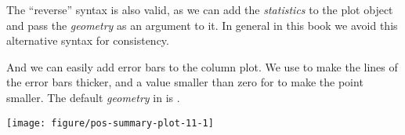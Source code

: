 \documentclass[krantz2]{krantz}\usepackage{knitr}%
\begin{document}
\begin{knitrout}\footnotesize
{}\color{fgcolor}\begin{kframe}
\begin{alltt}
  \hlopt{+}
  \hlstd{(} \hlstd{=} \hlstd{,}  
\end{alltt}
\end{kframe}
\end{knitrout}

The ``reverse'' syntax is also valid, as we can add the \emph{statistics} to the plot object and pass the \emph{geometry} as an argument to it. In general in this book we avoid this alternative syntax for consistency.

\begin{knitrout}\footnotesize
{}\color{fgcolor}\begin{kframe}
\begin{alltt}
  \hlopt{+}
  \hlstd{(} \hlstd{=} \hlstd{,}  
\end{alltt}
\end{kframe}
\end{knitrout}

And we can easily add error bars to the column plot. We use  to make the lines of the error bars thicker, and a value smaller than zero for  to make the point smaller. The default \emph{geometry} in  is .

\begin{knitrout}\footnotesize
{}\color{fgcolor}\begin{kframe}
\begin{alltt}
  \hlopt{+}
  \hlstd{(} \hlstd{=} \hlstd{,}   \hlopt{+}
  \hlstd{(} \hlstd{=} \hlstd{,}  \hlstd{=} \hlstd{,}
                \hlstd{=} \hlstd{,}  \hlstd{=} \hlstd{)}
\end{alltt}
\end{kframe}

{\centering \texttt{[image: figure/pos-summary-plot-11-1]} 

}



\end{knitrout}
\end{document}
